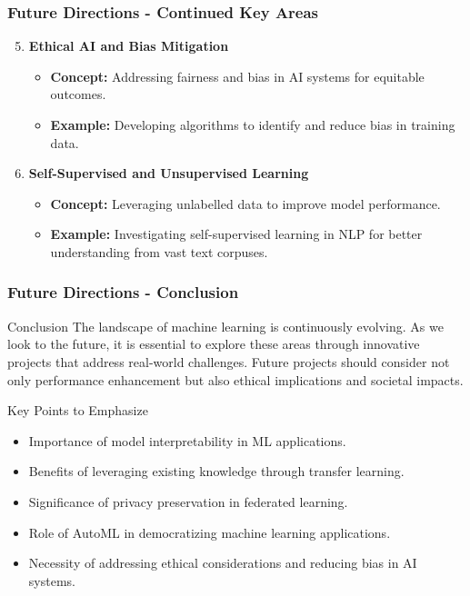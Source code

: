 \documentclass[aspectratio=169]{beamer}
\begin{document}
\begin{frame}[fragile]
    \frametitle{Future Directions - Continued Key Areas}
    \begin{enumerate}
        \setcounter{enumi}{4} %
        
        \item \textbf{Ethical AI and Bias Mitigation}
        \begin{itemize}
            \item \textbf{Concept:} Addressing fairness and bias in AI systems for equitable outcomes.
            \item \textbf{Example:} Developing algorithms to identify and reduce bias in training data.
        \end{itemize}

        \item \textbf{Self-Supervised and Unsupervised Learning}
        \begin{itemize}
            \item \textbf{Concept:} Leveraging unlabelled data to improve model performance.
            \item \textbf{Example:} Investigating self-supervised learning in NLP for better understanding from vast text corpuses.
        \end{itemize}
    \end{enumerate}
\end{frame}

\begin{frame}[fragile]
    \frametitle{Future Directions - Conclusion}
    \begin{block}{Conclusion}
        The landscape of machine learning is continuously evolving. 
        As we look to the future, it is essential to explore these areas through innovative projects that address real-world challenges. 
        Future projects should consider not only performance enhancement but also ethical implications and societal impacts.
    \end{block}

    \begin{block}{Key Points to Emphasize}
        \begin{itemize}
            \item Importance of model interpretability in ML applications.
            \item Benefits of leveraging existing knowledge through transfer learning.
            \item Significance of privacy preservation in federated learning.
            \item Role of AutoML in democratizing machine learning applications.
            \item Necessity of addressing ethical considerations and reducing bias in AI systems.
        \end{itemize}
    \end{block}
\end{frame}
\end{document}
